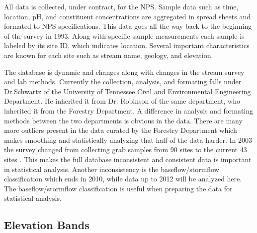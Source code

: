All data is collected, under contract, for the NPS.
Sample data such as time, location, pH, and constituent concentrations are aggregated in spread sheets and formated to NPS specifications.
This data goes all the way back to the beginning of the survey in 1993.
Along with specific sample measurements each sample is labeled by its site ID, which indicates location.
Several important characteristics are known for each site such as stream name, geology, and elevation.

The database is dynamic and changes along with changes in the stream survey and lab methods.
Currently the collection, analysis, and formating falls under Dr.Schwartz of the University of Tennessee Civil and Environmental Engineering Department.
He inherited it from Dr. Robinson of the same department, who inherited it from the Forestry Department.
A difference in analysis and formating methods between the two departments is obvious in the data.
There are many more outliers present in the data curated by the Forestry Department which makes smoothing and statistically analyzing that half of the data harder.
In 2003 the survey changed from collecting grab samples from 90 sites to the current 43 sites \citep{odom2003}.
This makes the full database inconsistent and consistent data is important in statistical analysis.
Another inconsistency is the baseflow/stormflow classification which ends in 2010, while data up to 2012 will be analyzed here.
The baseflow/stormflow classification is useful when preparing the data for statistical analysis.

\subsection{Elevation Bands}

